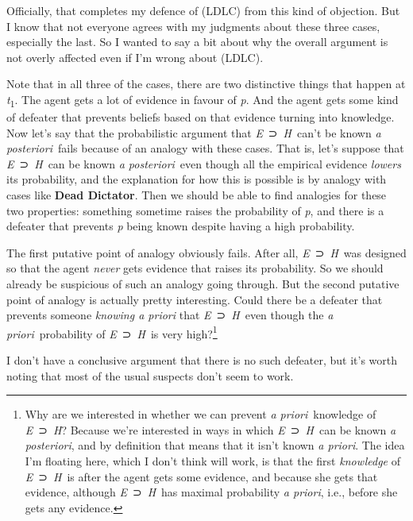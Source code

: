 \documentclass[
  10pt,
  letterpaper,
  DIV=11,
  numbers=noendperiod,
  twoside]{scrartcl}
\begin{document}
Officially, that completes my defence of (LDLC) from this kind of
objection. But I know that not everyone agrees with my judgments about
these three cases, especially the last. So I wanted to say a bit about
why the overall argument is not overly affected even if I'm wrong about
(LDLC).

Note that in all three of the cases, there are two distinctive things
that happen at \emph{t}\textsubscript{1}. The agent gets a lot of
evidence in favour of \emph{p}. And the agent gets some kind of defeater
that prevents beliefs based on that evidence turning into knowledge. Now
let's say that the probabilistic argument that \emph{E}~⊃~\emph{H}~can't
be known \emph{a posteriori}~fails because of an analogy with these
cases. That is, let's suppose that \emph{E}~⊃~\emph{H}~can be known
\emph{a posteriori}~even though all the empirical evidence \emph{lowers}
its probability, and the explanation for how this is possible is by
analogy with cases like \textbf{Dead Dictator}. Then we should be able
to find analogies for these two properties: something sometime raises
the probability of \emph{p}, and there is a defeater that prevents
\emph{p} being known despite having a high probability.

The first putative point of analogy obviously fails. After all,
\emph{E}~⊃~\emph{H}~was designed so that the agent \emph{never} gets
evidence that raises its probability. So we should already be suspicious
of such an analogy going through. But the second putative point of
analogy is actually pretty interesting. Could there be a defeater that
prevents someone \emph{knowing a priori} that \emph{E}~⊃~\emph{H}~even
though the \emph{a priori}~probability of \emph{E}~⊃~\emph{H}~is very
high?\footnote{Why are we interested in whether we can prevent \emph{a
  priori}~knowledge of \emph{E}~⊃~\emph{H}? Because we're interested in
  ways in which \emph{E}~⊃~\emph{H}~can be known \emph{a posteriori},
  and by definition that means that it isn't known \emph{a priori}. The
  idea I'm floating here, which I don't think will work, is that the
  first \emph{knowledge} of \emph{E}~⊃~\emph{H}~is after the agent gets
  some evidence, and because she gets that evidence, although
  \emph{E}~⊃~\emph{H}~has maximal probability \emph{a priori}, i.e.,
  before she gets any evidence.}

I don't have a conclusive argument that there is no such defeater, but
it's worth noting that most of the usual suspects don't seem to work.
\end{document}
